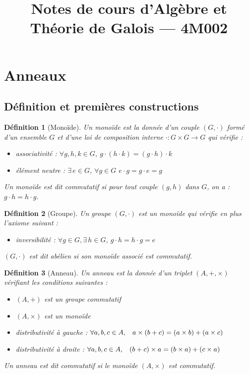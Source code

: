 \documentclass{article}           %
\title{Notes de cours d'Algèbre et Théorie de Galois — 4M002}
\author{}
\let\dummy\exists						%
\renewcommand*{\exists}{\dummy \,}
\newcommand\tq{\hspace{0.3cm}} 		%
\theoremstyle{break}
\theoremstyle{add}
\theoremstyle{break} %
\newtheorem{definition}{Définition}[section]
\theoremstyle{add}
\begin{document}
\maketitle
\tableofcontents
\newpage
\section{Anneaux}
\subsection{Définition et premières constructions}

\begin{definition}[Monoïde]
Un monoïde est la donnée d'un couple $(G, \cdot)$ formé d'un ensemble $G$ et d'une loi de composition interne $\cdot : G \times G \rightarrow G$ qui vérifie :
\begin{itemize}
\item \textit{associativité : } $\forall g,h,k \in G$, \tq $g \cdot (h \cdot k) = (g \cdot h) \cdot k$
\item \textit{élément neutre :} $\exists e \in G$, \tq $\forall g \in G$ \tq $e \cdot g = g \cdot e = g$
\end{itemize}

Un monoïde est dit \textit{commutatif} si pour tout couple $(g,h)$ dans $G$, on a : $g \cdot h = h \cdot g$.
\end{definition}

\begin{definition}[Groupe]
Un groupe $(G, \cdot)$ est un monoïde qui vérifie en plus l'axiome suivant :
\begin{itemize}
\item \textit{inversibilité : } $\forall g \in G, \exists h \in G$, \tq $g \cdot h = h \cdot g = e$
\end{itemize}
$(G, \cdot)$ est dit \textit{abélien} si son monoïde associé est commutatif.
\end{definition}

\begin{definition}[Anneau]
Un anneau est la donnée d'un triplet $(A, +, \times)$ vérifiant les conditions suivantes :
\begin{itemize}
\item $(A, +)$ est un groupe commutatif
\item $(A, \times)$ est un monoïde
\item \textit{distributivité à gauche : } $\forall a,b,c \in A, \tq a \times (b+c) = (a \times b) + (a \times c)$
\item \textit{distributivité à droite : } $\forall a,b,c \in A, \tq (b+c) \times a = (b \times a) + (c \times a)$
\end{itemize}

Un anneau est dit \textit{commutatif} si le monoïde $(A, \times)$ est commutatif.
\end{definition}
\end{document}
